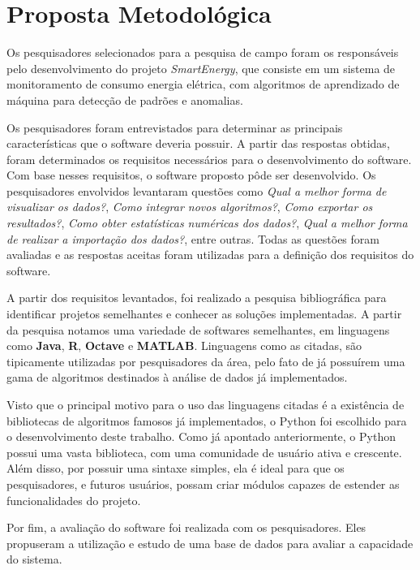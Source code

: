 \section{Proposta Metodológica}
    \label{sec:proposta-metodologica}

    Os pesquisadores selecionados para a pesquisa de campo foram os responsáveis pelo desenvolvimento do projeto \textit{SmartEnergy}, que consiste em um sistema de monitoramento de consumo energia elétrica, com algoritmos de aprendizado de máquina para detecção de padrões e anomalias.

    Os pesquisadores foram entrevistados para determinar as principais características que o software deveria possuir. A partir das respostas obtidas, foram determinados os requisitos necessários para o desenvolvimento do software. Com base nesses requisitos, o software proposto pôde ser desenvolvido. Os pesquisadores envolvidos levantaram questões como \textit{Qual a melhor forma de visualizar os dados?}, \textit{Como integrar novos algoritmos?}, \textit{Como exportar os resultados?}, \textit{Como obter estatísticas numéricas dos dados?}, \textit{Qual a melhor forma de realizar a importação dos dados?}, entre outras. Todas as questões foram avaliadas e as respostas aceitas foram utilizadas para a definição dos requisitos do software.

    A partir dos requisitos levantados, foi realizado a pesquisa bibliográfica para identificar projetos semelhantes e conhecer as soluções implementadas. A partir da pesquisa notamos uma variedade de softwares semelhantes, em linguagens como \textbf{Java}, \textbf{R}, \textbf{Octave} e \textbf{MATLAB}. Linguagens como as citadas, são tipicamente utilizadas por pesquisadores da área, pelo fato de já possuírem uma gama de algoritmos destinados à análise de dados já implementados.

    Visto que o principal motivo para o uso das linguagens citadas é a existência de bibliotecas de algoritmos famosos já implementados, o Python foi escolhido para o desenvolvimento deste trabalho. Como já apontado anteriormente, o Python possui uma vasta biblioteca, com uma comunidade de usuário ativa e crescente. Além disso, por possuir uma sintaxe simples, ela é ideal para que os pesquisadores, e futuros usuários, possam criar módulos capazes de estender as funcionalidades do projeto.

    Por fim, a avaliação do software foi realizada com os pesquisadores. Eles propuseram a utilização e estudo de uma base de dados para avaliar a capacidade do sistema.
